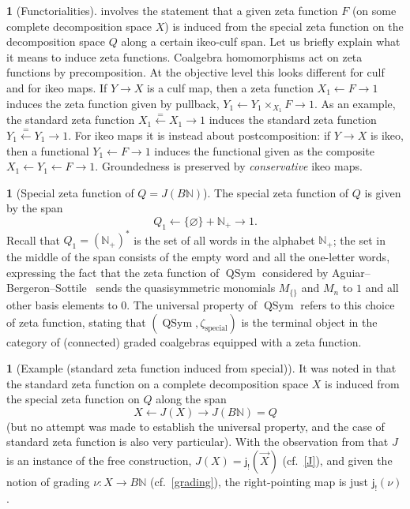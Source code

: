 \documentclass{amsart}
\def\overarrow#1{{\vec{#1}}}
\def\nondeg{\overarrow}
\newcommand{\lilj}{\mathsf{j}}
\newcommand{\QSym}{\operatorname{QSym}}
\newcommand{\N}{\mathbb{N}}
\theoremstyle{definition}
\theoremstyle{noname}
\newtheorem{blanko}[theorem]{}
\begin{document}
\begin{blanko}[Functorialities]
   involves the statement that a given zeta
  function $F$ (on some complete decomposition space $X$) is induced from the special
  zeta function on the decomposition space $Q$ along a certain ikeo-culf span. Let us
  briefly explain what it means to induce zeta functions. Coalgebra homomorphisms act
  on zeta functions by precomposition. At the objective level this looks different
  for culf and for ikeo maps. If $Y \to X$ is a culf map, then a zeta function
  $X_1\leftarrow F \to 1$ induces the zeta function given by pullback, $Y_1
  \leftarrow Y_1\times_{X_1} F \to 1$. 
  As an example, the standard zeta function 
  $X_1
  \stackrel{=}\leftarrow X_1 \to 1$ induces the standard zeta function $Y_1
  \stackrel{=}\leftarrow Y_1 \to 1$. For ikeo maps it is instead about
  postcomposition: if $Y \to X$ is ikeo, then a functional $Y_1\leftarrow F \to
  1$ induces the functional given as the composite $X_1 \leftarrow
  Y_1\leftarrow F \to 1$. 
  Groundedness is preserved by \emph{conservative} ikeo maps.
\end{blanko}

\begin{blanko}[Special zeta function of $Q=J(B\N)$]
  The special zeta function of $Q$ is given by the span
  $$
  Q_1 \longleftarrow \{\varnothing\} + \N_+ \longrightarrow 1 .
  $$
  Recall that $Q_1= (\N_+)^*$ is the set of all words in the alphabet $\N_+$;
  the set in the middle of the span consists of the empty word and all the
  one-letter words, expressing the fact that the zeta function of $\QSym$
  considered by Aguiar--Bergeron--Sottile~\cite{Aguiar-Bergeron-Sottile} sends
  the quasisymmetric monomials $M_{\{\}}$ and $M_n$ to $1$ and all other basis
  elements to $0$. The universal property of $\QSym$ refers to this choice of
  zeta function, stating that $(\QSym, \zeta_{\operatorname{special}})$ is the
  terminal object in the category of (connected) graded coalgebras equipped with
  a zeta function.
\end{blanko}

\begin{blanko}[Example (standard zeta function induced from special)]
  It was  noted in \cite{GKT:QSym} that
  the standard zeta function on a complete decomposition space $X$ is induced from the
  special zeta function on $Q$ along the span
  $$
  X \longleftarrow J(X) \longrightarrow J(B\N) = Q
  $$
  (but no attempt was made to establish the universal property, and the case of 
  standard zeta function is also very particular). With the observation from
  \cite{Hackney-Kock:2210.11192} that $J$ is an instance of the free 
  construction,
  $J(X) = \lilj_! (\nondeg X)$ (cf.~\ref{J}), and given the notion of grading $\nu: X \to
  B\N$ (cf.~\ref{grading}), the right-pointing map is just $\lilj_!(\nu)$.
\end{blanko}
\end{document}

